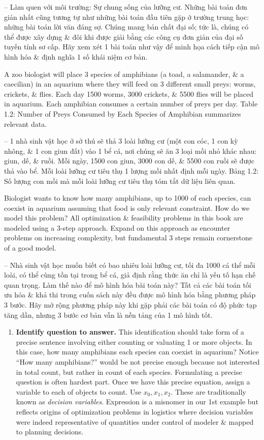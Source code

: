 \documentclass{article}
\begin{document}
\begin{itemize}
\begin{itemize}
        -- {\sf Làm quen với môi trường: Sự chung sống của lưỡng cư.} Những bài toán đơn giản nhất cũng tương tự như những bài toán đầu tiên gặp ở trường trung học: những bài toán lời văn đáng sợ. Chúng mang bản chất đại số; tức là, chúng có thể được xây dựng \& đôi khi được giải bằng các công cụ đơn giản của đại số tuyến tính sơ cấp. Hãy xem xét 1 bài toán như vậy để minh họa cách tiếp cận mô hình hóa \& định nghĩa 1 số khái niệm cơ bản.

        A zoo biologist will place 3 species of amphibians (a toad, a salamander, \& a caecilian) in an aquarium where they will feed on 3 different small preys: worms, crickets, \& flies. Each day 1500 worms, 3000 crickets, \& 5500 flies will be placed in aquarium. Each amphibian consumes a certain number of preys per day. {\sf Table 1.2: Number of Preys Consumed by Each Species of Amphibian} summarizes relevant data.

        -- 1 nhà sinh vật học ở sở thú sẽ thả 3 loài lưỡng cư (một con cóc, 1 con kỳ nhông, \& 1 con giun đất) vào 1 bể cá, nơi chúng sẽ ăn 3 loại mồi nhỏ khác nhau: giun, dế, \& ruồi. Mỗi ngày, 1500 con giun, 3000 con dế, \& 5500 con ruồi sẽ được thả vào bể. Mỗi loài lưỡng cư tiêu thụ 1 lượng mồi nhất định mỗi ngày. {\sf Bảng 1.2: Số lượng con mồi mà mỗi loài lưỡng cư tiêu thụ} tóm tắt dữ liệu liên quan.

        Biologist wants to know how many amphibians, up to 1000 of each species, can coexist in aquarium assuming that food is only relevant constraint. How do we model this problem? All optimization \& feasibility problems in this book are modeled using a 3-step approach. Expand on this approach as encounter problems on increasing complexity, but fundamental 3 steps remain cornerstone of a good model.

        -- Nhà sinh vật học muốn biết có bao nhiêu loài lưỡng cư, tối đa 1000 cá thể mỗi loài, có thể cùng tồn tại trong bể cá, giả định rằng thức ăn chỉ là yếu tố hạn chế quan trọng. Làm thế nào để mô hình hóa bài toán này? Tất cả các bài toán tối ưu hóa \& khả thi trong cuốn sách này đều được mô hình hóa bằng phương pháp 3 bước. Hãy mở rộng phương pháp này khi gặp phải các bài toán có độ phức tạp tăng dần, nhưng 3 bước cơ bản vẫn là nền tảng của 1 mô hình tốt.
        \begin{enumerate}
            \item {\bf Identify question to answer.} This identification should take form of a precise sentence involving either counting or valuating 1 or more objects. In this case, how many amphibians each species can coexist in aquarium? Notice ``How many amphibians?'' would be not precise enough because not interested in total count, but rather in count of each species. Formulating a precise question is often hardest part. Once we have this precise equation, assign a variable to each of objects to count. Use $x_0,x_1,x_2$. These are traditionally known as {\it decision variables}. Expression is a misnomer in our 1st example but reflects origins of optimization problems in logistics where decision variables were indeed representative of quantities under control of modeler \& mapped to planning decisions.


\end{enumerate}
\end{itemize}
\end{itemize}
\end{document}

